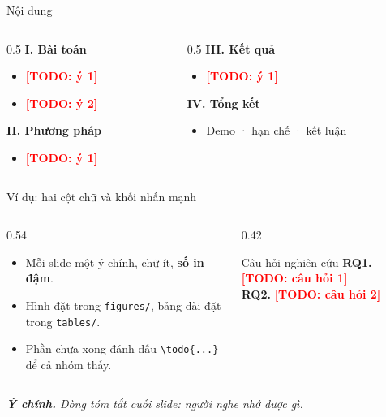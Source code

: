 \documentclass[aspectratio=169,11pt]{beamer}
\newcommand{\todo}[1]{\textcolor{red}{\textbf{[TODO: #1]}}}
\newcommand{\takeaway}[1]{{\footnotesize\itshape\color{hustdark}\textbf{Ý chính.} #1\par}}
\begin{document}
\begin{frame}{Nội dung}
  \begin{columns}[T]
    \begin{column}{0.5\textwidth}
      \textbf{\color{hustred}I. Bài toán}
      \begin{itemize}\setlength\itemsep{0.2em}
        \item \todo{ý 1}
        \item \todo{ý 2}
      \end{itemize}
      \vspace{0.6em}
      \textbf{\color{hustred}II. Phương pháp}
      \begin{itemize}\setlength\itemsep{0.2em}
        \item \todo{ý 1}
      \end{itemize}
    \end{column}
    \begin{column}{0.5\textwidth}
      \textbf{\color{hustred}III. Kết quả}
      \begin{itemize}\setlength\itemsep{0.2em}
        \item \todo{ý 1}
      \end{itemize}
      \vspace{0.6em}
      \textbf{\color{hustred}IV. Tổng kết}
      \begin{itemize}\setlength\itemsep{0.2em}
        \item Demo · hạn chế · kết luận
      \end{itemize}
    \end{column}
  \end{columns}
\end{frame}

\begin{frame}{Ví dụ: hai cột chữ và khối nhấn mạnh}
  \begin{columns}[T]
    \begin{column}{0.54\textwidth}
      \small
      \begin{itemize}\setlength\itemsep{0.4em}
        \item Mỗi slide một ý chính, chữ ít, \textbf{số in đậm}.
        \item Hình đặt trong \texttt{figures/}, bảng dài đặt trong \texttt{tables/}.
        \item Phần chưa xong đánh dấu \texttt{\textbackslash todo\{...\}} để cả nhóm thấy.
      \end{itemize}
    \end{column}
    \begin{column}{0.42\textwidth}
      \begin{block}{\small Câu hỏi nghiên cứu}
        \scriptsize
        \textbf{RQ1.} \todo{câu hỏi 1}\\[0.3em]
        \textbf{RQ2.} \todo{câu hỏi 2}
      \end{block}
    \end{column}
  \end{columns}
  \vfill
  \takeaway{Dòng tóm tắt cuối slide: người nghe nhớ được gì.}
\end{frame}
\end{document}
